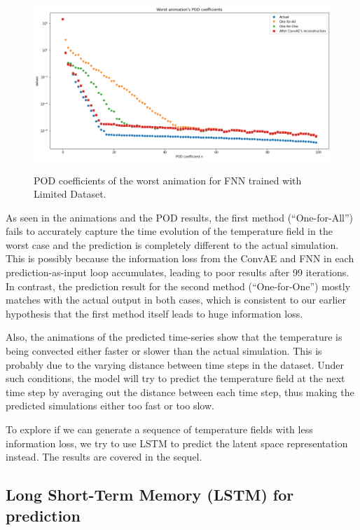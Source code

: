 \begin{figure}[H]
    \centering
    \caption{POD coefficients of the worst animation for FNN trained with Limited Dataset.}
    \includegraphics[scale=0.4]{figures/mantle_convection_images/limited_dataset/FNN_Worst_POD.png}
    \label{figure:FNN_limited_worst_POD}
\end{figure}

As seen in the animations and the POD results, the first method (``One-for-All'') fails to accurately capture the time evolution of the temperature field in the worst case and the prediction is completely different to the actual simulation. This is possibly because the information loss from the ConvAE and FNN in each prediction-as-input loop accumulates, leading to poor results after 99 iterations. In contrast, the prediction result for the second method (``One-for-One'') mostly matches with the actual output in both cases, which is consistent to our earlier hypothesis that the first method itself leads to huge information loss.

Also, the animations of the predicted time-series show that the temperature is being convected either faster or slower than the actual simulation. This is probably due to the varying distance between time steps in the dataset. Under such conditions, the model will try to predict the temperature field at the next time step by averaging out the distance between each time step, thus making the predicted simulations either too fast or too slow.

To explore if we can generate a sequence of temperature fields with less information loss, we try to use LSTM to predict the latent space representation instead. The results are covered in the sequel.


\subsection{Long Short-Term Memory (LSTM) for prediction}
\label{sec:mc_limited_lstm}


